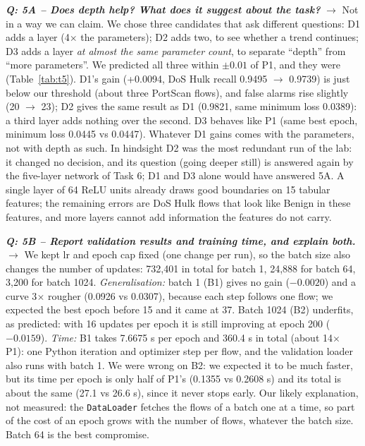 \documentclass[9pt]{extarticle}
\newcommand{\Q}[1]{\textbf{\emph{Q: #1}}}
\newcommand{\run}[1]{\textsf{#1}}
\begin{document}
\Q{5A -- Does depth help? What does it suggest about the task?} $\rightarrow$ Not in a way we can claim. We chose three candidates that ask different questions: \run{D1} adds a layer (4$\times$ the parameters); \run{D2} adds two, to see whether a trend continues; \run{D3} adds a layer \emph{at almost the same parameter count}, to separate ``depth'' from ``more parameters''. We predicted all three within $\pm0.01$ of \run{P1}, and they were (Table~\ref{tab:t5}). \run{D1}'s gain (+0.0094, DoS Hulk recall 0.9495 $\rightarrow$ 0.9739) is just below our threshold (about three PortScan flows), and false alarms rise slightly (20 $\rightarrow$ 23); \run{D2} gives the same result as \run{D1} (0.9821, same minimum loss 0.0389): a third layer adds nothing over the second. \run{D3} behaves like \run{P1} (same best epoch, minimum loss 0.0445 vs 0.0447). Whatever \run{D1} gains comes with the parameters, not with depth as such. In hindsight \run{D2} was the most redundant run of the lab: it changed no decision, and its question (going deeper still) is answered again by the five-layer network of Task 6; \run{D1} and \run{D3} alone would have answered 5A. A single layer of 64 ReLU units already draws good boundaries on 15 tabular features; the remaining errors are DoS Hulk flows that look like Benign in these features, and more layers cannot add information the features do not carry.

\Q{5B -- Report validation results and training time, and explain both.} $\rightarrow$ We kept lr and epoch cap fixed (one change per run), so the batch size also changes the number of updates: 732,401 in total for batch 1, 24,888 for batch 64, 3,200 for batch 1024. \emph{Generalisation:} batch 1 (\run{B1}) gives no gain ($-0.0020$) and a curve 3$\times$ rougher (0.0926 vs 0.0307), because each step follows one flow; we expected the best epoch before 15 and it came at 37. Batch 1024 (\run{B2}) underfits, as predicted: with 16 updates per epoch it is still improving at epoch 200 ($-0.0159$). \emph{Time:} \run{B1} takes 7.6675 s per epoch and 360.4 s in total (about 14$\times$ \run{P1}): one Python iteration and optimizer step per flow, and the validation loader also runs with batch 1. We were wrong on \run{B2}: we expected it to be much faster, but its time per epoch is only half of \run{P1}'s (0.1355 vs 0.2608 s) and its total is about the same (27.1 vs 26.6 s), since it never stops early. Our likely explanation, not measured: the \texttt{DataLoader} fetches the flows of a batch one at a time, so part of the cost of an epoch grows with the number of flows, whatever the batch size. Batch 64 is the best compromise.
\end{document}
